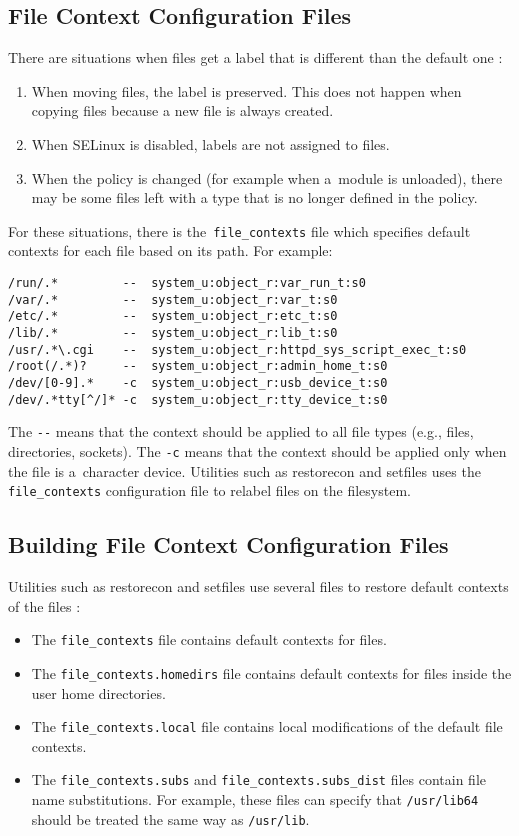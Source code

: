 \subsection{File Context Configuration Files}
There are situations when files get a label that is different than the default
one \cite{selinuxguide}:
\begin{enumerate}
    \item When moving files, the label is preserved. This does not happen when
        copying files because a new file is always created.
    \item When SELinux is disabled, labels are not assigned to files.
    \item When the policy is changed (for example when a~module is unloaded),
        there may be some files left with a type that is no longer defined in
        the policy.
\end{enumerate}
For these situations, there is the~\texttt{file\_contexts} file which specifies
default contexts for each file based on its path. For example:
\begin{lstlisting}
/run/.*         --  system_u:object_r:var_run_t:s0
/var/.*	        --  system_u:object_r:var_t:s0
/etc/.*	        --  system_u:object_r:etc_t:s0
/lib/.*	        --  system_u:object_r:lib_t:s0
/usr/.*\.cgi    --  system_u:object_r:httpd_sys_script_exec_t:s0
/root(/.*)?     --  system_u:object_r:admin_home_t:s0
/dev/[0-9].*    -c  system_u:object_r:usb_device_t:s0
/dev/.*tty[^/]* -c  system_u:object_r:tty_device_t:s0
\end{lstlisting}
The \texttt{-{}-} means that the context should be applied to all file types
(e.g., files, directories, sockets). The \texttt{-c} means that the context
should be applied only when the file is a~character device. Utilities such as
restorecon and setfiles uses the \texttt{file\_contexts} configuration file to
relabel files on the filesystem.

\subsection{Building File Context Configuration Files}
Utilities such as restorecon and setfiles use several files to restore default
contexts of the files \cite[pp.~165--167]{tsn}:
\begin{itemize}
    \item The \texttt{file\_contexts} file contains default contexts for files.
    \item The \texttt{file\_contexts.homedirs} file contains default contexts
        for files inside the user home directories.
    \item The \texttt{file\_contexts.local} file contains local modifications of
        the default file contexts.
    \item The \texttt{file\_contexts.subs} and
        \texttt{file\_contexts.subs\_dist} files contain file name
        substitutions. For example, these files can specify that
        \texttt{/usr/lib64} should be treated the same way as \texttt{/usr/lib}.
\end{itemize}


